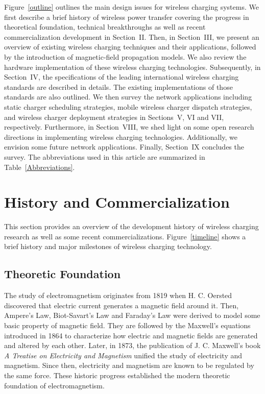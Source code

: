 \documentclass[twocolumn,10pt]{IEEEtran}
\begin{document}
Figure~\ref{outline} outlines the main design issues for wireless charging systems. We first describe a brief history of wireless power transfer covering the progress in theoretical foundation, technical breakthroughs as well as recent commercialization development in Section~II. Then, in Section~III, we present an overview of existing wireless charging techniques and their applications, followed by the introduction of magnetic-field propagation models. We also review the hardware implementation of these wireless charging technologies. Subsequently, in Section~IV, the specifications of the leading international wireless charging standards are described in details. The existing implementations of those standards are also outlined. We then survey the network applications including static charger scheduling strategies, mobile wireless charger dispatch strategies, and wireless charger deployment strategies in Sections~V, VI and VII, respectively. Furthermore, in Section~VIII, we shed light on some open research directions in implementing wireless charging technologies. Additionally, we envision some future network applications. Finally, Section~IX concludes the survey.  The abbreviations used in this article are summarized in Table~\ref{Abbreviations}.







\section{History and Commercialization}



This section provides an overview of the development history of wireless charging research as well as some recent commercializations.  
Figure~\ref{timeline} shows a brief history and major milestones of wireless charging technology.



\subsection{Theoretic Foundation}
The study of electromagnetism originates from 1819 when H. C. Oersted discovered that electric current generates a magnetic field around it. Then, Ampere's Law, Biot-Savart's Law and Faraday's Law were derived to model some basic property of magnetic field. They are followed by the Maxwell's equations introduced in 1864 to characterize how electric and magnetic fields are generated and altered by each other.
Later, in 1873, the publication of J. C. Maxwell's book \emph{A Treatise on Electricity and Magnetism} \cite{C.1873Maxwell} unified the study of electricity and magnetism. Since then, electricity and magnetism are known to be regulated by the same force. These historic progress established the modern theoretic foundation of electromagnetism.
\end{document}
